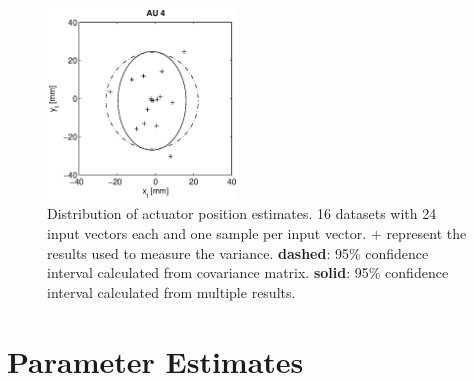 \begin{figure}[hbtp]
\includegraphics[width = 0.45\textwidth]{images/results/confidence_95_interval_AU4.eps}
\caption{Distribution of actuator position estimates. 16 datasets with 24 input vectors each and one sample per input vector.
$\mathbf{+}$ represent the results used to measure the variance.
\textbf{dashed}: 95\% confidence interval calculated from covariance matrix.
\textbf{solid}: 95\% confidence interval calculated from multiple results. }
\label{fig:result_95pc_confidence_all}
\end{figure}


\section{Parameter Estimates}
\label{sec:app_parameter_est}

